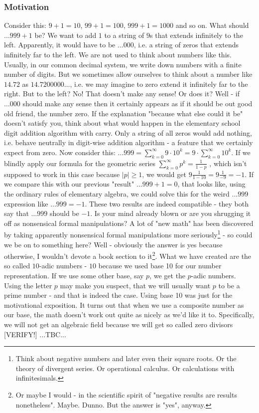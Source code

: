 \subsubsection{Motivation}
Consider this: $9 + 1 = 10$, $99 + 1 = 100$, $999 + 1 = 1000$ and so on. What should $\ldots 999 + 1$ be? We want to add $1$ to a string of $9$s that extends infinitely to the left. Apparently, it would have to be $\ldots 000$, i.e. a string of zeros that extends infinitely far to the left. We are not used to think about numbers like this. Usually, in our common decimal system, we write down numbers with a finite number of digits. But we sometimes allow ourselves to think about a number like $14.72$ as $14.7200000\ldots$, i.e. we may imagine to zero extend it infinitely far to the right. But to the left? No! That doesn't make any sense! Or does it? Well - if $\ldots 000$ should make any sense then it certainly appears as if it should be out good old friend, the number zero. If the explanation "because what else could it be" doesn't satisfy you, think about what would happen in the elementary school digit addition algorithm with carry. Only a string of all zeros would add nothing, i.e. behave neutrally in digit-wise addition algorithm - a feature that we certainly expect from zero. Now consider this: $\ldots 999  = \sum_{k=0}^{\infty} 9 \cdot 10^k = 9 \cdot \sum_{k=0}^{\infty} 10^k$. If we blindly apply our formula for the geometric series $\sum_{k=0}^{\infty} p^k = \frac{1}{1-p}$ , which isn't supposed to work in this case because $|p| \geq 1$, we would get $9 \frac{1}{1-10} = 9 \frac{1}{-9} = -1$. If we compare this with our previous "result" $\ldots 999 + 1 = 0$, that looks like, using the ordinary rules of elementary algebra, we could solve this for the weird $\ldots999$ expression like $\ldots 999 = -1$. These two results are indeed compatible - they both say that  $\ldots 999$ should be $-1$. Is your mind already blown or are you shrugging it off as nonsensical formal manipulations? A lot of "new math" has been discovered by taking apparently nonsensical formal manipulations more seriously\footnote{Think about negative numbers and later even their square roots. Or the theory of divergent series. Or operational calculus. Or calculations with infinitesimals.} - so could we be on to something here? Well - obviously the answer is yes because otherwise, I wouldn't devote a book section to it\footnote{Or maybe I would - in the scientific spirit of "negative results are results nonetheless". Maybe. Dunno. But the answer is "yes", anyway.}. What we have created are the so called $10$-adic numbers - $10$ because we used base 10 for our number representation. If we use some other base, say $p$, we get the $p$-adic numbers. Using the letter $p$ may make you suspect, that we will usually want $p$ to be a prime number - and that is indeed the case. Using base 10 was just for the motivational exposition. It turns out that when we use a composite number as our base, the math doesn't work out quite as nicely as we'd like it to. Specifically, we will not get an algebraic field because we will get so called zero divisors [VERIFY!] ...TBC...

